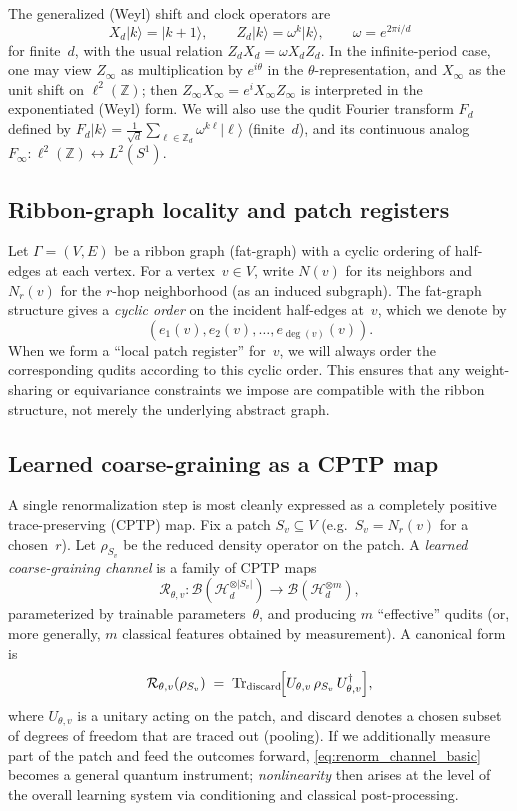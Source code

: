 \documentclass[11pt,oneside]{amsbook}
\numberwithin{equation}{section}
\theoremstyle{plain}
\theoremstyle{definition}
\theoremstyle{remark}
\newcommand{\ket}[1]{\lvert #1 \rangle}
\begin{document}
The generalized (Weyl) shift and clock operators are
\[
  X_d \ket{k} = \ket{k+1},\qquad
  Z_d \ket{k} = \omega^{k}\ket{k},\qquad \omega=e^{2\pi i/d}
\]
for finite~$d$, with the usual relation $Z_d X_d = \omega X_d Z_d$.
In the infinite-period case, one may view $Z_\infty$ as multiplication by $e^{i\theta}$ in the
$\theta$-representation, and $X_\infty$ as the unit shift on $\ell^2(\mathbb{Z})$; then
$Z_\infty X_\infty = e^{i} X_\infty Z_\infty$ is interpreted in the exponentiated (Weyl) form.
We will also use the qudit Fourier transform $F_d$ defined by
$F_d\ket{k} = \frac{1}{\sqrt{d}}\sum_{\ell\in \mathbb{Z}_d}\omega^{k\ell}\ket{\ell}$ (finite~$d$),
and its continuous analog $F_\infty:\ell^2(\mathbb{Z})\leftrightarrow L^2(S^1)$.

\subsection{Ribbon-graph locality and patch registers}
Let $\Gamma=(V,E)$ be a ribbon graph (fat-graph) with a cyclic ordering of half-edges at each
vertex. For a vertex~$v\in V$, write $N(v)$ for its neighbors and $N_r(v)$ for the
$r$-hop neighborhood (as an induced subgraph). The fat-graph structure gives a \emph{cyclic order}
on the incident half-edges at~$v$, which we denote by
\[
  (e_1(v),e_2(v),\dots,e_{\deg(v)}(v)).
\]
When we form a ``local patch register'' for~$v$, we will always order the corresponding qudits
according to this cyclic order. This ensures that any weight-sharing or equivariance constraints
we impose are compatible with the ribbon structure, not merely the underlying abstract graph.

\subsection{Learned coarse-graining as a CPTP map}
A single renormalization step is most cleanly expressed as a completely positive trace-preserving
(CPTP) map. Fix a patch $S_v \subseteq V$ (e.g.\ $S_v=N_r(v)$ for a chosen~$r$). Let
$\rho_{S_v}$ be the reduced density operator on the patch.
A \emph{learned coarse-graining channel} is a family of CPTP maps
\[
  \mathcal{R}_{\theta,v}:\mathcal{B}(\mathcal{H}_d^{\otimes |S_v|})\to
  \mathcal{B}(\mathcal{H}_d^{\otimes m}),
\]
parameterized by trainable parameters~$\theta$, and producing $m$ ``effective'' qudits (or,
more generally, $m$ classical features obtained by measurement).
A canonical form is
\begin{equation}
  \mathcal{R}_{\theta,v}(\rho_{S_v})
  \;=\;
  \mathrm{Tr}_{\mathrm{discard}}\!\Bigl[
    U_{\theta,v}\,\rho_{S_v}\,U_{\theta,v}^\dagger
  \Bigr],
  \label{eq:renorm_channel_basic}
\end{equation}
where $U_{\theta,v}$ is a unitary acting on the patch, and $\mathrm{discard}$ denotes a chosen
subset of degrees of freedom that are traced out (pooling). If we additionally measure part of the
patch and feed the outcomes forward, \eqref{eq:renorm_channel_basic} becomes a general quantum
instrument; \emph{nonlinearity} then arises at the level of the overall learning system via
conditioning and classical post-processing.
\end{document}
